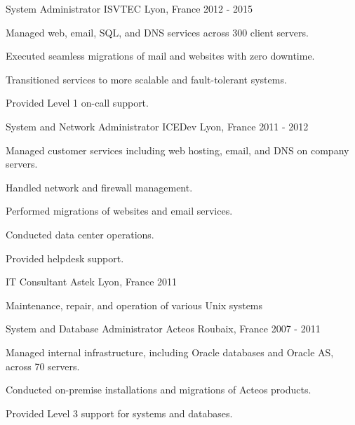 \begin{cventries}

\cventry
{System Administrator} %
{ISVTEC} %
{Lyon, France} %
{2012 - 2015} %
{ %
\begin{cvitems}
\item {Managed web, email, SQL, and DNS services across 300 client servers.}
\item {Executed seamless migrations of mail and websites with zero downtime.}
\item {Transitioned services to more scalable and fault-tolerant systems.}
\item {Provided Level 1 on-call support.}
\end{cvitems}
}


\cventry
{System and Network Administrator} %
{ICEDev} %
{Lyon, France} %
{2011 - 2012} %
{ %
\begin{cvitems}
\item {Managed customer services including web hosting, email, and DNS on company servers.}
\item {Handled network and firewall management.}
\item {Performed migrations of websites and email services.}
\item {Conducted data center operations.}
\item {Provided helpdesk support.}
\end{cvitems}
}


\cventry
{IT Consultant} %
{Astek} %
{Lyon, France} %
{2011} %
{ %
\begin{cvitems}
\item {Maintenance, repair, and operation of various Unix systems}
\end{cvitems}
}


\cventry
{System and Database Administrator} %
{Acteos} %
{Roubaix, France} %
{2007 - 2011} %
{ %
\begin{cvitems}
\item {Managed internal infrastructure, including Oracle databases and Oracle AS, across 70 servers.}
\item {Conducted on-premise installations and migrations of Acteos products.}
\item {Provided Level 3 support for systems and databases.}
\end{cvitems}
}


\end{cventries}
